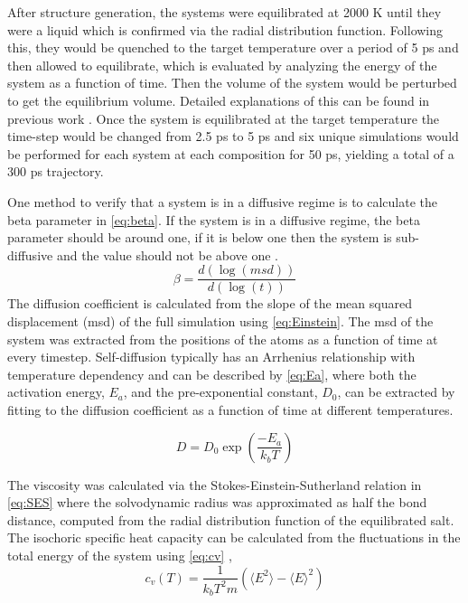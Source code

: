 \documentclass[review]{elsarticle}
\begin{document}
After structure generation, the systems were equilibrated at 2000 K until they were a liquid which is confirmed via the radial distribution function. Following this, they would be quenched to the target temperature over a period of 5 ps and then allowed to equilibrate, which is evaluated by analyzing the energy of the system as a function of time. Then the volume of the system would be perturbed to get the equilibrium volume. Detailed explanations of this can be found in previous work \cite{duemmler_liclkcl, duemmler_naclmgcl}. Once the system is equilibrated at the target temperature the time-step would be changed from 2.5 ps to 5 ps and six unique simulations would be performed for each system at each composition for 50 ps, yielding a total of a 300 ps trajectory.  

One method to verify that a system is in a diffusive regime is to calculate the beta parameter in \cref{eq:beta}. If the system is in a diffusive regime, the beta parameter should be around one, if it is below one then the system is sub-diffusive and the value should not be above one \cite{maginn2007atomistic}.
\begin{equation}
  \label{eq:beta}
     \beta = \frac{d(\log{(msd)})}{d(\log{(t)})}
\end{equation}
The diffusion coefficient is calculated from the slope of the mean squared displacement (msd) of the full simulation using \cref{eq:Einstein}. The msd of the system was extracted from the positions of the atoms as a function of time at every timestep. Self-diffusion typically has an Arrhenius relationship with temperature dependency and can be described by \cref{eq:Ea}, where both the activation energy, \textit{$E_a$}, and the pre-exponential constant, \textit{$D_0$}, can be extracted by fitting to the diffusion coefficient as a function of time at different temperatures\cite{dick2002size}. 

\begin{equation}
  \label{eq:Ea}
     D = D_0\exp{(\frac{-E_a}{k_bT})}
\end{equation}

The viscosity was calculated via the Stokes-Einstein-Sutherland relation in \cref{eq:SES} where the solvodynamic radius was approximated as half the bond distance, computed from the radial distribution function of the equilibrated salt. The isochoric specific heat capacity can be calculated from the fluctuations in the total energy of the system using \cref{eq:cv} \cite{xiong2014evolution},
\begin{equation}
  \label{eq:cv}
     c_v(T) = \frac{1}{k_bT^2m} (\langle E^2\rangle -\langle E \rangle^2)
\end{equation}
\end{document}
